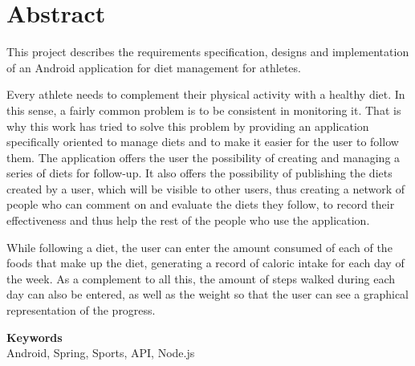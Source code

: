 \newpage
\chapter*{Abstract}
\noindent



This project describes the requirements specification, designs and implementation of an Android application for diet management for athletes.

Every athlete needs to complement their physical activity with a healthy diet. In this sense, a fairly common problem is to be consistent in monitoring it. That is why this work has tried to solve this problem by providing an application specifically oriented to manage diets and to make it easier for the user to follow them. The application offers the user the possibility of creating and managing a series of diets for follow-up. It also offers the possibility of publishing the diets created by a user, which will be visible to other users, thus creating a network of people who can comment on and evaluate the diets they follow, to record their effectiveness and thus help the rest of the people who use the application.

While following a diet, the user can enter the amount consumed of each of the foods that make up the diet, generating a record of caloric intake for each day of the week. As a complement to all this, the amount of steps walked during each day can also be entered, as well as the weight so that the user can see a graphical representation of the progress.

\begin{center}
    \textbf{Keywords}\\
Android, Spring, Sports, API, Node.js
\end{center}